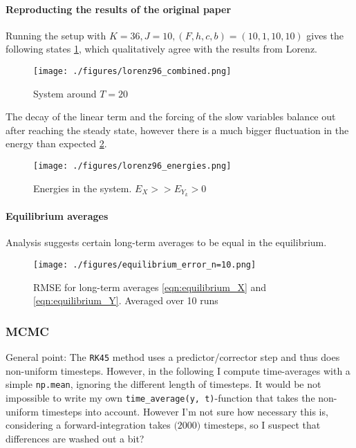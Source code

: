 \documentclass[11pt]{article}
\begin{document}
\paragraph{Reproducting the results of the original paper}
\label{sec:org43ea943}
Running the setup with \(K=36, J=10, (F, h, c, b) = (10, 1, 10, 10)\) gives the following states
\ref{fig:lorenz96_combined},
which qualitatively agree with the results from Lorenz.

\begin{figure}[htbp]
\centering
\texttt{[image: ./figures/lorenz96\_combined.png]}
\caption{\label{fig:lorenz96_combined}
System around \(T=20\)}
\end{figure}

The decay of the linear term and the forcing of the slow variables balance out after reaching the
steady state, however there is a much bigger fluctuation in the energy than expected \ref{fig:lorenz_energy}.

\begin{figure}[htbp]
\centering
\texttt{[image: ./figures/lorenz96\_energies.png]}
\caption{\label{fig:lorenz_energy}
Energies in the system. \(E_X >> E_{Y_k} > 0\)}
\end{figure}

\paragraph{Equilibrium averages}
\label{sec:org9747eae}
Analysis suggests certain long-term averages to be equal in the equilibrium.

\begin{figure}[htbp]
\centering
\texttt{[image: ./figures/equilibrium\_error\_n=10.png]}
\caption{\label{fig:lorenz_rmse}
RMSE for long-term averages \ref{eqn:equilibrium_X} and \ref{eqn:equilibrium_Y}. Averaged over 10 runs}
\end{figure}

\subsubsection{MCMC}
\label{sec:org3162435}
General point: The \texttt{RK45} method uses a predictor/corrector step and thus does non-uniform timesteps.
However, in the following I compute time-averages with a simple \texttt{np.mean}, ignoring the different
length of timesteps. It would be not impossible to write my own \texttt{time\_average(y, t)}-function that
takes the non-uniform timesteps into account. However I'm not sure how necessary this is, considering
a forward-integration takes \(\mathcal(2000)\) timesteps, so I suspect that differences are washed out
a bit?
\end{document}
